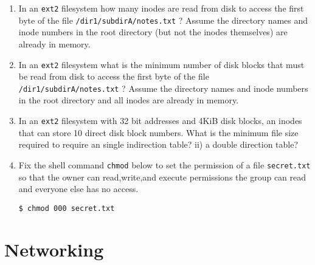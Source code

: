 \begin{enumerate}

\item In an \texttt{ext2} filesystem how many inodes are read from disk to access the first byte of the file \texttt{/dir1/subdirA/notes.txt} ? Assume the directory names and inode numbers in the root directory (but not the inodes themselves) are already in memory.

\item In an \texttt{ext2} filesystem what is the minimum number of disk blocks that must be read from disk to access the first byte of the file \texttt{/dir1/subdirA/notes.txt} ? Assume the directory names and inode numbers in the root directory and all inodes are already in memory.

\item In an \texttt{ext2} filesystem with 32 bit addresses and 4KiB disk blocks, an inodes that can store 10 direct disk block numbers. What is the minimum file size required to require an single indirection table? ii) a double direction table?

\item Fix the shell command \texttt{chmod} below to set the permission of a file \texttt{secret.txt} so that the owner can read,write,and execute permissions the group can read and everyone else has no access.

\begin{verbatim}
$ chmod 000 secret.txt
\end{verbatim}

\end{enumerate}

\section{Networking}

